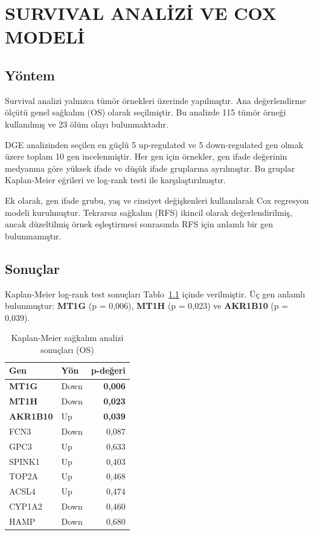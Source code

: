 \documentclass[12pt,a4paper,oneside]{report}
\begin{document}
\chapter{SURVIVAL ANALİZİ VE COX MODELİ}

\section{Yöntem}

Survival analizi yalnızca tümör örnekleri üzerinde yapılmıştır. Ana değerlendirme ölçütü genel sağkalım (OS) olarak seçilmiştir. Bu analizde 115 tümör örneği kullanılmış ve 23 ölüm olayı bulunmaktadır. 

DGE analizinden seçilen en güçlü 5 up-regulated ve 5 down-regulated gen olmak üzere toplam 10 gen incelenmiştir. Her gen için örnekler, gen ifade değerinin medyanına göre yüksek ifade ve düşük ifade gruplarına ayrılmıştır. Bu gruplar Kaplan-Meier eğrileri ve log-rank testi ile karşılaştırılmıştır.

Ek olarak, gen ifade grubu, yaş ve cinsiyet değişkenleri kullanılarak Cox regresyon modeli kurulmuştur. Tekrarsız sağkalım (RFS) ikincil olarak değerlendirilmiş, ancak düzeltilmiş örnek eşleştirmesi sonrasında RFS için anlamlı bir gen bulunmamıştır.

\section{Sonuçlar}

Kaplan-Meier log-rank test sonuçları Tablo~\ref{tab:survival} içinde verilmiştir. Üç gen anlamlı bulunmuştur: \textbf{MT1G} (p = 0,006), \textbf{MT1H} (p = 0,023) ve \textbf{AKR1B10} (p = 0,039).

\begin{table}[H]
\centering
\caption{Kaplan-Meier sağkalım analizi sonuçları (OS)}
\label{tab:survival}
\begin{tabular}{llr}
\toprule
\textbf{Gen} & \textbf{Yön} & \textbf{p-değeri} \\
\midrule
\textbf{MT1G} & Down & \textbf{0,006} \\
\textbf{MT1H} & Down & \textbf{0,023} \\
\textbf{AKR1B10} & Up & \textbf{0,039} \\
FCN3 & Down & 0,087 \\
GPC3 & Up & 0,633 \\
SPINK1 & Up & 0,403 \\
TOP2A & Up & 0,468 \\
ACSL4 & Up & 0,474 \\
CYP1A2 & Down & 0,460 \\
HAMP & Down & 0,680 \\
\bottomrule
\end{tabular}
\end{table}
\end{document}
